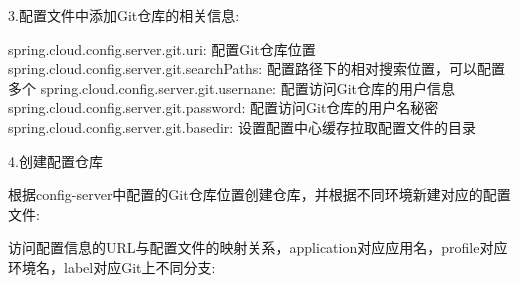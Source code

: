 \documentclass[letterpaper,10pt,english]{sphinxmanual}
\begin{document}
3.配置文件中添加Git仓库的相关信息:

\begin{sphinxVerbatim}[commandchars=\\\{\}]
spring.cloud.config.server.git.uri: 配置Git仓库位置
spring.cloud.config.server.git.searchPaths: 配置路径下的相对搜索位置，可以配置多个
spring.cloud.config.server.git.usernane: 配置访问Git仓库的用户信息
spring.cloud.config.server.git.password: 配置访问Git仓库的用户名秘密
spring.cloud.config.server.git.basedir: 设置配置中心缓存拉取配置文件的目录
\end{sphinxVerbatim}

4.创建配置仓库

根据config-server中配置的Git仓库位置创建仓库，并根据不同环境新建对应的配置文件:

\begin{sphinxVerbatim}[commandchars=\\\{\}]
\end{sphinxVerbatim}

访问配置信息的URL与配置文件的映射关系，application对应应用名，profile对应环境名，label对应Git上不同分支:

\begin{sphinxVerbatim}[commandchars=\\\{\}]
\PYG{p}{[}\PYG{p}{]}
\end{sphinxVerbatim}
\end{document}
